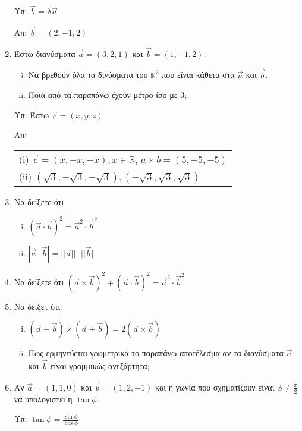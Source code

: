 \begin{enumerate}
		\hfill Υπ: $ \vec{b} = \lambda \vec{a} $		

		\hfill Απ: $ \vec{b}=(2,-1,2) $

	\item Έστω διανύσματα $ \vec{a}=(3,2,1) $ και $ \vec{b}=(1,-1,2) $.
		\begin{enumerate}[(i)]
			\item Να βρεθούν όλα τα δινύσματα του $ \mathbb{R}^{3} $ που είναι κάθετα στα $ \vec{a} $ και $ \vec{b} $.
			\item Ποια από τα παραπάνω έχουν μέτρο ίσο με $3$; 
		\end{enumerate}

		\hfill Υπ: Έστω $ \vec{c} = (x,y,z) $

		\hfill Απ: \begin{tabular}{l}
			(i) $ \vec{c} = (x,-x,-x), x\in \mathbb{R}$, $a\times b = (5,-5,-5)$ \\
			(ii) $ (\sqrt{3}, - \sqrt{3}, - \sqrt{3}), (-\sqrt{3}, \sqrt{3}, \sqrt{3})$ 
		\end{tabular}

	\item Να δείξετε ότι 
		\begin{enumerate}[(i)]
			\item $(\vec{a}\cdot \vec{b})^{2} = \vec{a}^{2}\cdot \vec{b}^{2}$
			\item $|\vec{a}\cdot \vec{b}| = ||\vec{a}|| \cdot ||\vec{b}||$
		\end{enumerate}
		
	\item Να δείξετε ότι $ (\vec{a}\times \vec{b})^{2} + (\vec{a}\cdot \vec{b})^{2} =
		\vec{a}^{2}\cdot \vec{b}^{2} $  

	\item Να δείξετ ότι
		\begin{enumerate}[i)]
			\item $ ( \vec{a} - \vec{b} ) \times ( \vec{a} + \vec{b} ) = 2 (\vec{a} \times \vec{b}) $
			\item Πως ερμηνεύεται γεωμετρικά το παραπάνω αποτέλεσμα αν τα διανύσματα $ \vec{a} $ και $ \vec{b} $ είναι γραμμικώς ανεξάρτητα;
		\end{enumerate}
		
	\item Αν $ \vec{a} = (1,1,0) $ και $ \vec{b} = (1,2,-1) $ και η γωνία που σχηματίζουν είναι $
		\phi\neq \frac{\pi}{2} $ να υπολογιστεί η $ \tan{\phi} $ 

		\hfill Υπ: $ \tan{\phi} = \frac{\sin{\phi}}{\cos{\phi}} $


\end{enumerate}

